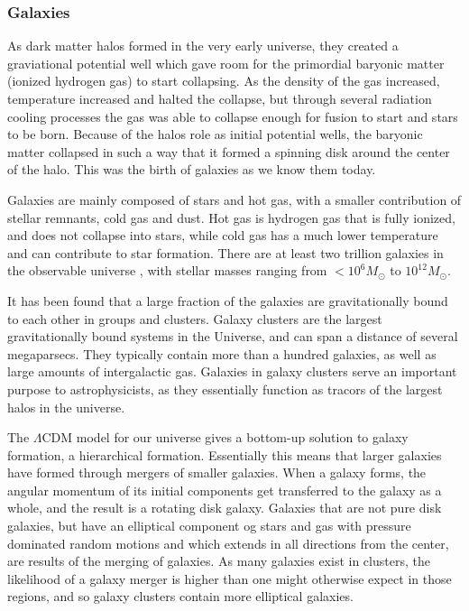 \subsubsection{Galaxies}
As dark matter halos formed in the very early universe, they created a graviational potential well which gave room for the primordial baryonic matter (ionized hydrogen gas) to start collapsing. As the density of the gas increased, temperature increased and halted the collapse, but through several radiation cooling processes the gas was able to collapse enough for fusion to start and stars to be born. Because of the halos role as initial potential wells, the baryonic matter collapsed in such a way that it formed a spinning disk around the center of the halo. This was the birth of galaxies as we know them today.

Galaxies are mainly composed of stars and hot gas, with a smaller contribution of stellar remnants, cold gas and dust. Hot gas is hydrogen gas that is fully ionized, and does not collapse into stars, while cold gas has a much lower temperature and can contribute to star formation. There are at least two trillion galaxies in the observable universe \parencite{Conselice2016}, with stellar masses ranging from $<10^6 M_{\odot}$ to $10^{12} M_{\odot}$. 

It has been found that a large fraction of the galaxies are gravitationally bound to each other in groups and clusters. %
Galaxy clusters are the largest gravitationally bound systems in the Universe, and can span a distance of several megaparsecs. They typically contain more than a hundred galaxies, as well as large amounts of intergalactic gas. Galaxies in galaxy clusters serve an important purpose to astrophysicists, as they essentially function as tracors of the largest halos in the universe.

The $\Lambda$CDM model for our universe gives a bottom-up solution to galaxy formation, a hierarchical formation. Essentially this means that larger galaxies have formed through mergers of smaller galaxies. When a galaxy forms, the angular momentum of its initial components get transferred to the galaxy as a whole, and the result is a rotating disk galaxy. Galaxies that are not pure disk galaxies, but have an elliptical component og stars and gas with pressure dominated random motions and which extends in all directions from the center, are results of the merging of galaxies. As many galaxies exist in clusters, the likelihood of a galaxy merger is higher than one might otherwise expect in those regions, and so galaxy clusters contain more elliptical galaxies.

